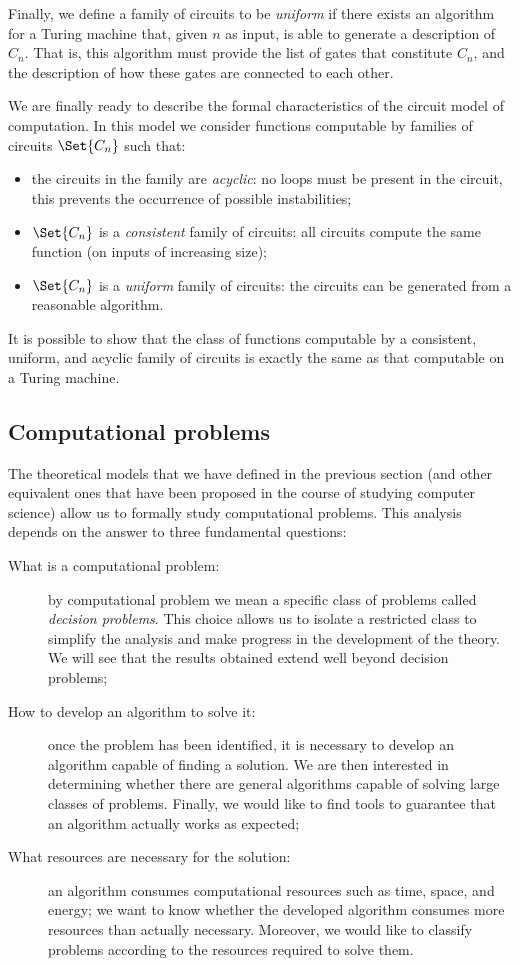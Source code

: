 Finally, we define a family of circuits to be \emph{uniform} if there exists an algorithm for a Turing machine that, given $n$ as input, is able to generate a description of $C_n$. That is, this algorithm must provide the list of gates that constitute $C_n$, and the description of how these gates are connected to each other.

We are finally ready to describe the formal characteristics of the circuit model of computation. In this model we consider functions computable by families of circuits $\Set{C_n}$ such that:
\begin{itemize}
	\item the circuits in the family are \emph{acyclic}: no loops must be present in the circuit, this prevents the occurrence of possible instabilities;
	\item $\Set{C_n}$ is a \emph{consistent} family of circuits: all circuits compute the same function (on inputs of increasing size);
	\item $\Set{C_n}$ is a \emph{uniform} family of circuits: the circuits can be generated from a reasonable algorithm. 
\end{itemize}

It is possible to show that the class of functions computable by a consistent, uniform, and acyclic family of circuits is exactly the same as that computable on a Turing machine.

\subsection{Computational problems}
The theoretical models that we have defined in the previous section (and other equivalent ones that have been proposed in the course of studying computer science) allow us to formally study computational problems. This analysis depends on the answer to three fundamental questions:
\begin{description}
	\item[What is a computational problem:] by computational problem we mean a specific class of problems called \emph{decision problems}. This choice allows us to isolate a restricted class to simplify the analysis and make progress in the development of the theory. We will see that the results obtained extend well beyond decision problems;
	\item[How to develop an algorithm to solve it:] once the problem has been identified, it is necessary to develop an algorithm capable of finding a solution. We are then interested in determining whether there are general algorithms capable of solving large classes of problems. Finally, we would like to find tools to guarantee that an algorithm actually works as expected;
	\item[What resources are necessary for the solution:] an algorithm consumes computational resources such as time, space, and energy; we want to know whether the developed algorithm consumes more resources than actually necessary. Moreover, we would like to classify problems according to the resources required to solve them.
\end{description}

